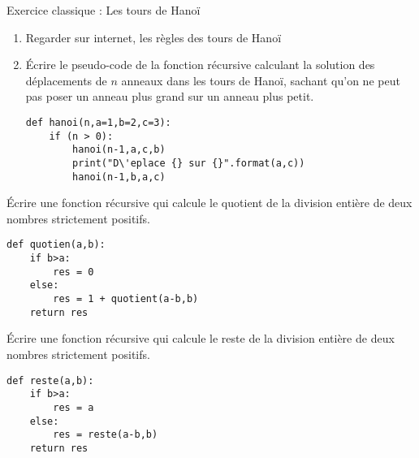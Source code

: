 \documentclass[12pt,fleqn]{article} %
\begin{document}
\begin{exercise}
	Exercice classique : Les tours de Hanoï \\
\begin{enumerate}
	\item Regarder sur internet, les règles des tours de Hanoï
	\item \'Ecrire le pseudo-code de la fonction récursive calculant la solution des déplacements de $n$ anneaux dans les tours de Hanoï, sachant qu'on ne peut pas poser un anneau plus grand sur un anneau plus petit.
		\begin{center}
		\begin{varwidth}[t]{.5\textwidth}
			\begin{lstlisting}[language=iPython,linewidth = 13cm]
def hanoi(n,a=1,b=2,c=3):
	if (n > 0):
		hanoi(n-1,a,c,b)
		print("D\'eplace {} sur {}".format(a,c))
		hanoi(n-1,b,a,c)
	\end{lstlisting}\end{varwidth}\end{center}
\end{enumerate}
\end{exercise}

\begin{exercise}
	Écrire une fonction récursive qui calcule le quotient de la division entière de deux nombres strictement positifs.\\
		\begin{center}
		\begin{varwidth}[t]{.5\textwidth}
			\begin{lstlisting}[language=iPython,linewidth = 13cm]
def quotien(a,b):
	if b>a:
		res = 0
	else:
		res = 1 + quotient(a-b,b)
	return res
	\end{lstlisting}\end{varwidth}\end{center}
\end{exercise}

\begin{exercise}
	Écrire une fonction récursive qui calcule le reste de la division entière de deux nombres strictement positifs.
	\begin{center}
	\begin{varwidth}[t]{.5\textwidth}
		\begin{lstlisting}[language=iPython,linewidth = 10cm]
def reste(a,b):
	if b>a:
		res = a
	else:
		res = reste(a-b,b)
	return res
\end{lstlisting}\end{varwidth}\end{center}
\end{exercise}
\end{document}
